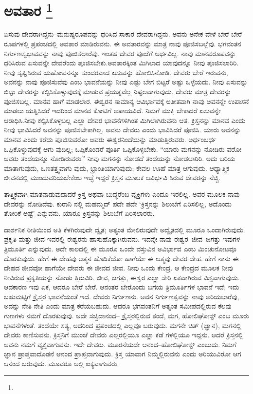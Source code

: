 
\chapter[ಅವತಾರ ]{ಅವತಾರ \protect\footnote{}}

ಏಸುವು ದೇವರಾಗಿದ್ದನು–ಮನುಷ್ಯರೂಪವನ್ನು ಧರಿಸಿದ ಸಾಕಾರ ದೇವರಾಗಿದ್ದನು. ಅವನು ಅನೇಕ ವೇಳೆ ಬೇರೆ ಬೇರೆ ರೂಪಗಳಲ್ಲಿ ಪ್ರಪಂಚದಲ್ಲಿ ಅವತಾರ ಮಾಡಿರುವನು. ಈ ಅವತಾರವನ್ನು ಮಾತ್ರ ನಾವು ಪೂಜಿಸಬಲ್ಲೆವು. ಭಗವಂತನ ನಿರ್ಗುಣಸ್ವಭಾವವನ್ನು ನಾವು ಪೂಜಿಸಲಾರೆವು. ಇಂತಹ ದೇವರ ಪೂಜೆಗೆ ಅರ್ಥವಿಲ್ಲ. ನಾವು ಮಾನವರೂಪವನ್ನು ಧರಿಸಿರುವ ಏಸುವನ್ನೇ ದೇವರೆಂದು ಪೂಜಿಸಬೇಕು.ಅವತಾರಕ್ಕಿಂತ ಮಿಗಿಲಾದ ಯಾವುದನ್ನೂ ನೀವು ಪೂಜಿಸಲಾರಿರಿ. ನೀವು ಸೃಷ್ಟಿಸಿರುವ ಯಹೋವನನ್ನೂ ಸುಂದರವಾದ ಏಸುವನ್ನು ಹೋಲಿಸಿನೋಡಿ. ದೇವರು ಬೇರೆ ಇರುವನು, ಅವನನ್ನು ನಾವು ಪೂಜಿಸುವೆವು ಎಂಬ ಭಾವನೆಯನ್ನು ನೀವು ಎಷ್ಟು ಬೇಗ ಬಿಟ್ಟರೆ ಅಷ್ಟು ಒಳ್ಳೆಯದು. ನೀವು ಏಸುವನ್ನು ಬಿಟ್ಟು ದೇವರನ್ನು ಕಲ್ಪಿಸಿಕೊಳ್ಳುವುದಕ್ಕೆ ಮಾಡುವ ಪ್ರಯತ್ನವೆಲ್ಲ ನಿಷ್ಫಲವಾಗುವುದು. ದೇವರು ಮಾತ್ರ ದೇವರನ್ನು ಪೂಜಿಸಬಲ್ಲ. ಮಾನವ ಹಾಗೆ ಮಾಡಲಾರ. ಈಶ್ವರನ ಸಾಮಾನ್ಯ ಆವಿರ್ಭಾವಕ್ಕೆ ಅತೀತವಾಗಿ ನಾವು ಅವನನ್ನೇ ಉಪಾಸನೆ ಮಾಡಲು ಯತ್ನಿಸಿದರೆ ಇದರಿಂದ ಮಾನವ ಕೋಟಿಗೆ ಅಪಾಯವಿದೆ. ನಿಮಗೆ ಮುಕ್ತಿ ಬೇಕಾದರೆ ಏಸುವನ್ನೇ ಆರಾಧಿಸಿ.ನೀವು ಕಲ್ಪಿಸಿಕೊಳ್ಳಬಲ್ಲ ಎಲ್ಲಾ ದೇವರ ಭಾವನೆಗಳಿಗಿಂತ ಮಿಗಿಲಾಗಿರುವನು ಆತ. ಕ್ರಿಸ್ತನನ್ನು ಮಾನವ ಎಂದು ನೀವು ಭಾವಿಸಿದರೆ ಅವನನ್ನು ಪೂಜಿಸಬೇಕಾಗಿಲ್ಲ. ಅವನು ದೇವರು ಎಂದು ಭಾವಿಸಿದರೆ ಪೂಜಿಸಿ. ಯಾರು ಅವನನ್ನು ಮಾನವ ಎಂದು ಕರೆದು ಪೂಜಿಸುವರೋ ಅವರು ಈಶ್ವರನಿಂದೆಯನ್ನು ಮಾಡುತ್ತಿರುವರು. ಅರ್ಧಂಬರ್ಧ ಒಪ್ಪಿಕೊಳ್ಳುವುದಕ್ಕೆ ಆಗು ವುದಿಲ್ಲ; ಒಪ್ಪಿಕೊಂಡರೆ ಪೂರ್ತಿ ಒಪ್ಪಿಕೊಳ್ಳಬೇಕು. “ಯಾರು ಮಗನನ್ನು ನೋಡಿರು ವರೋ ಅವರು ತಂದೆಯನ್ನೂ ನೋಡಿರುವರು.” ನೀವು ಮಗನನ್ನು ನೋಡದೆ ತಂದೆಯನ್ನು ನೋಡಲಾರಿರಿ. ಅದು ಬರಿಯ ಮಾತಾಗುವುದು, ಒಣತತ್ತ್ವವಾಗು ವುದು, ಭ್ರಾಂತಿಯಾಗುವುದು; ಕೇವಲ ಊಹೆ ಮಾತ್ರ ಆಗುವುದು. ಆಧ್ಯಾತ್ಮಿಕ ಜೀವನದಲ್ಲಿ ಮುಂದುವರಿಯಬೇಕೆಂಬ ಇಚ್ಛೆ ಇದ್ದರೆ ಕ್ರಿಸ್ತನ ಮೂಲಕ ಆವಿರ್ಭವಿ ಸಿರುವ ದೇವರನ್ನು ನೆಚ್ಚಿ.

ತಾತ್ತ್ವಿಕವಾಗಿ ಮಾತನಾಡುವುದಾದರೆ ಕ್ರಿಸ್ತ ಅಥವಾ ಬುದ್ಧರೆಂಬ ವ್ಯಕ್ತಿಗಳು ಎಂದೂ ಇರಲಿಲ್ಲ. ಅವರ ಮೂಲಕ ನಾವು ದೇವರನ್ನು ನೋಡಿದೆವು. ಕುರಾನಿ ನಲ್ಲಿ ಮಹಮ್ಮದ್​ ಪದೇ ಪದೇ ‘ಕ್ರಿಸ್ತನನ್ನು ಶಿಲುಬೆಗೆ ಏರಿಸಲಿಲ್ಲ, ಅದೊಂದು ತೋರಿಕೆ ಅಷ್ಟೆ’ ಎನ್ನುವನು. ಯಾರೂ ಕ್ರಿಸ್ತನನ್ನು ಶಿಲುಬೆಗೆ ಏರಿಸಲಾರರು.

ದಾರ್ಶನಿಕ ರೀತಿಯಿಂದ ಅತಿ ಕೆಳಗಿರುವುದೇ ದ್ವೈತ; ಅತ್ಯಂತ ಮೇಲಿರುವುದೇ ಅದ್ವೈತದಲ್ಲಿ ಮೂರೂ ಒಂದಾಗಿರುವುದು. ಪ್ರಕೃತಿ ಮತ್ತು ಜೀವ ಇವರಲ್ಲಿ ಈಶ್ವರನು ಹಾಸುಹೊಕ್ಕಾಗಿರುವನು. ಇದನ್ನೇ ನಾವು ಈಶ್ವರ–ಜೀವ–ಜಗತ್ತು ಇವುಗಳ ತ್ರಿಮೂರ್ತಿ ಎನ್ನುವುದು. ಅದೇ ಕಾಲದಲ್ಲಿ ಈ ಮೂರೂ ಒಂದೇ ವಸ್ತುವಿನ ಅವಿರ್ಭಾವ ಎಂಬ ಮಿಂಚುನೋಟವೂ ದೊರಕುವುದು. ಹೇಗೆ ಈ ದೇಹವು ಆತ್ಮನ ಹೊದಿಕೆಯೋ ಹಾಗೆಯೇ ಈ ಆತ್ಮವು ದೇವರ ದೇಹ. ಹೇಗೆ ನಾನು ಈ ದೇಹದ ಜೀವವೋ ಹಾಗೆಯೇ ದೇವರು ಈ ಜೀವದ ಜೀವ. ನೀವು ಒಂದು ಕೇಂದ್ರ. ಆ ಕೇಂದ್ರದ ಮೂಲಕ ನೀವು ನೀವಿರುವ ಪ್ರಕೃತಿಯನ್ನು ನೋಡು ತ್ತಿರುವಿರಿ. ಜೀವ, ಜಗತ್ತು, ಈಶ್ವರ ಎಲ್ಲಾ ಸೇರಿ ಏಕವಾಗಿರುವ ವಿಶ್ವವಾಗುವುದು. ಆದಕಾರಣ ಇವು ಏಕ, ಆದರೂ ಬೇರೆ ಬೇರೆ. ಆನಂತರ ಬೇರೊಂದು ಬಗೆಯ ತ್ರಿಮೂರ್ತಿಗಳ ಭಾವನೆ ಇದೆ; ಇದು ಬಹುಮಟ್ಟಿಗೆ ಕ್ರೈಸ್ತರ ಭಾವನೆಯಂತೆ ಇದೆ. ದೇವರು ನಿರ್ಗುಣನು. ಅವನ ನಿರ್ಗುಣತ್ವವನ್ನು ನಾವು ಅರಿಯಲಾರೆವು, ಅದನ್ನು ನೇತಿ ನೇತಿ ಎಂದು ಮಾತ್ರ ಕರೆಯಬಹುದು. ಆದರೂ ಭಗವಂತನಿಗೆ ಅತ್ಯಂತ ಸಮೀಪದಲ್ಲಿರುವ ಕೆಲವು ಗುಣಗಳು ನಮಗೆ ದೊರಕುವುವು. ಅದೇ ಸಚ್ಚಿದಾನಂದ– ಕ್ರೈಸ್ತರಲ್ಲಿರುವ ತಂದೆ, ಮಗ, ಹೋಲಿಘೋಸ್ಟ್​ ಎಂಬ ಮೂರು ಭಾವನೆಗಳಂತೆ. ತಂದೆಯೇ ಸತ್ಯ, ಅದರಿಂದ ಪ್ರಪಂಚದಲ್ಲಿ ಎಲ್ಲವೂ ಬರುವುದು. ಮಗನೇ ಚಿತ್​ (ಜ್ಞಾನ), ಮಗನಲ್ಲಿ ದೇವರು ಕಾಣಿಸುವನು. ಕ್ರಿಸ್ತನಿಗೆ ಮುಂಚೆ ದೇವರು ಎಲ್ಲರಲ್ಲಿಯೂ ಎಲ್ಲಾ ಕಡೆ ಗಳಲ್ಲಿಯೂ ಇದ್ದನು. ಆದರೆ ಕ್ರಿಸ್ತನಲ್ಲಿ ಅವನು ನಮಗೆ ವ್ಯಕ್ತವಾಗುವನು. ಇದೇ ದೇವರು. ಮೂರನೆಯದೇ ಆನಂದ–ಹೋಲಿಘೋಸ್ಟ್​ ಎಂಬುದು. ನಿಮಗೆ ಜ್ಞಾನ ಪ್ರಾಪ್ತವಾದೊಡನೆ ಆನಂದ ಪ್ರಾಪ್ತವಾಗುವುದು. ಕ್ರಿಸ್ತ ಯಾವಾಗ ನಿಮ್ಮಲ್ಲಿರುವನು ಎಂದು ಅರಿಯುವಿರೋ ಆಗ ಆನಂದ ಬರುವುದು. ಮೂವರೂ ಅಲ್ಲಿ ಐಕ್ಯವಾಗುವರು.

